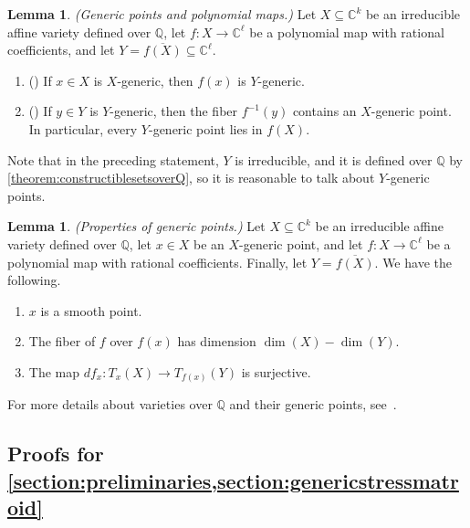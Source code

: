 \documentclass[11pt,a4paper,dvipsnames]{scrartcl}
\theoremstyle{definition}
\newtheorem{lemma}[theorem]{Lemma}
\newcommand{\CC}{\mathbb{C}}
\newcommand{\QQ}{\mathbb{Q}}
\begin{document}
\begin{lemma}\label{lemma:genericimage} \emph{(Generic points and polynomial maps.)}\newline
    Let $X \subseteq \CC^k$ be an irreducible affine variety defined over $\QQ$, let $f : X \rightarrow \CC^\ell$ be a polynomial map with rational coefficients, and let $Y = \overline{f(X)} \subseteq \CC^\ell$.
    \begin{enumerate}
        \item (\cite[Lemma A.7]{gortler.etal_2019}) If $x \in X$ is $X$-generic, then $f(x)$ is $Y$-generic.
        \item (\cite[Lemmas 4.4 and A.8]{gortler.etal_2019}) If $y \in Y$ is $Y$-generic, then the fiber $f^{-1}(y)$ contains an $X$-generic point. In particular, every $Y$-generic point lies in $f(X)$.
    \end{enumerate}
\end{lemma}

Note that in the preceding statement, $Y$ is irreducible, and it is defined over $\QQ$ by \cref{theorem:constructiblesetsoverQ}, so it is reasonable to talk about $Y$-generic points.

\begin{lemma}\label{lemma:genericproperties} \emph{(Properties of generic points.)}\newline
    Let $X \subseteq \CC^k$ be an irreducible affine variety defined over $\QQ$, let $x \in X$ be an $X$-generic point, and let $f: X \rightarrow \CC^\ell$ be a polynomial map with rational coefficients. Finally, let $Y = \overline{f(X)}$. We have the following.
    \begin{enumerate}
        \item $x$ is a smooth point.
        \item The fiber of $f$ over $f(x)$ has dimension $\dim(X) - \dim(Y)$.
        \item The map $df_x : T_x(X) \rightarrow T_{f(x)}(Y)$ is surjective.
    \end{enumerate}
\end{lemma}

\noindent For more details about varieties over $\QQ$ and their generic points, see~\cite[Section 2.3.8]{garamvolgyi_2024}.

\subsection{Proofs for \texorpdfstring{\cref{section:preliminaries,section:genericstressmatroid}}{Sections 2 and 3}}\label{appendix:prelims}
\end{document}
